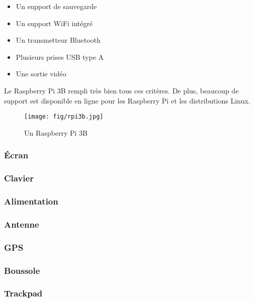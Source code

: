 \begin{itemize}
	\item Un support de sauvegarde
	\item Un support WiFi intégré
	\item Un transmetteur Bluetooth
	\item Plusieurs prises USB type A
	\item Une sortie vidéo
\end{itemize}

Le Raspberry Pi 3B rempli très bien tous ces critères. De plus, beaucoup de
support est disponible en ligne pour les Raspberry Pi et les distributions
Linux.

\begin{figure}[H]
	\center
	\texttt{[image: fig/rpi3b.jpg]}
	\caption{Un Raspberry Pi 3B}
	\label{f:rpi3b}
\end{figure}

\subsubsection{Écran}



\subsubsection{Clavier}



\subsubsection{Alimentation}



\subsubsection{Antenne}



\subsubsection{GPS}



\subsubsection{Boussole}



\subsubsection{Trackpad}



